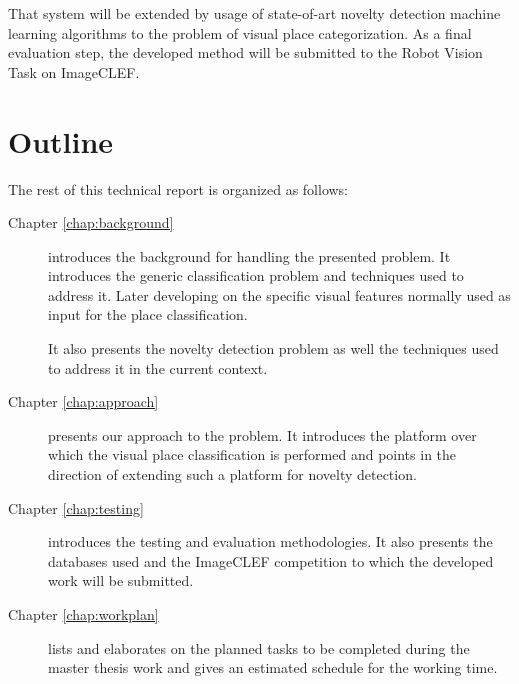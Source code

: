 That system will be extended by usage of state-of-art novelty detection machine learning algorithms to the problem of visual place categorization.
As a final evaluation step, the developed method will be submitted to the Robot Vision Task on \gls{ImageCLEF}.

\section{Outline}
The rest of this technical report is organized as follows:

\begin{description}
\item[Chapter \ref{chap:background}] introduces the background for handling the presented problem.
It introduces the generic classification problem and techniques used to address it. Later developing on the specific visual features normally used as input for the place classification.

It also presents the novelty detection problem as well the techniques used to address it in the current context.

\item[Chapter \ref{chap:approach}] presents our approach to the problem. It introduces the platform over which the visual place classification is performed and points in the direction of extending such a platform for novelty detection.

\item[Chapter \ref{chap:testing}] introduces the testing and evaluation methodologies.
It also presents the databases used and the \gls{ImageCLEF} competition to which the developed work will be submitted.

\item[Chapter \ref{chap:workplan}] lists and elaborates on the planned tasks to be completed during the master thesis work and gives an estimated schedule for the working time. 
\end{description}

